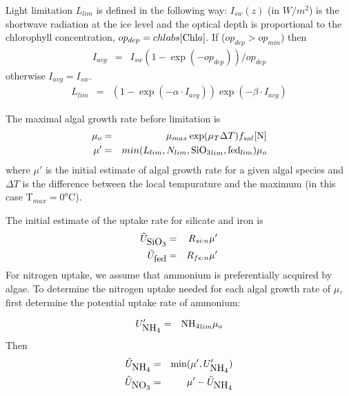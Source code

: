 Light limitation $L_{lim}$ is defined in the following way:   $I
_{sw}(z)$ (in $W/m^2$) is the shortwave radiation
at the ice level and the optical depth is proportional to the
chlorophyll concentration, $op_{dep} = chlabs [\mbox{Chl}a] $. 
If ($op_{dep} > op_{min}$) then
\begin{eqnarray}
I_{avg} & = & I_{sw}(1- \exp(-op_{dep}))/op_{dep} \nonumber 
\end{eqnarray}
otherwise $I_{avg} = I_{sw}$.
\begin{eqnarray}
L_{lim} & = & (1 - \exp(-\alpha\cdot I_{avg}))\exp(-\beta \cdot I_{avg})
\end{eqnarray}

The maximal algal growth rate before limitation is
\begin{eqnarray}
\mu_o & = & \mu_{max}\exp(\mu_T\Delta T)f_{sal}[\mbox{N}]  \nonumber \\ 
\mu' & = & min(L_{lim},N_{lim},\mbox{SiO$_3$}_{lim},\mbox{fed}_{lim}) \mu_o
\end{eqnarray}
where $\mu'$ is the initial estimate of algal growth rate for a given
algal species and $\Delta T$ is the difference between the local
tempurature and the maximum (in this case T$_{max} = 0^o$C).

The initial estimate of the uptake rate for silicate and iron  is
\begin{eqnarray}
\tilde{U}_{\mbox{SiO$_3$}} & = & R_{si:n}\mu' \nonumber \\
\tilde{U}_{\mbox{fed}} & = & R_{fe:n}\mu' 
\end{eqnarray}
For nitrogen uptake, we assume that ammonium is preferentially acquired by algae.  To
determine the nitrogen uptake needed for each algal growth rate of
$\mu$, first determine the potential  uptake rate of 
ammonium:

\begin{eqnarray}
U'_{\mbox{NH$_4$}} & = &\mbox{NH$_4$}_{lim}\mu_o
\end{eqnarray}
Then
\begin{eqnarray}
\tilde{U}_{\mbox{NH$_4$}} & = & \min(\mu', U'_{\mbox{NH$_4$}}) \nonumber \\
\tilde{U}_{\mbox{NO$_3$}} & = & \mu' - \tilde{U}_{\mbox{NH$_4$}}
\end{eqnarray}

